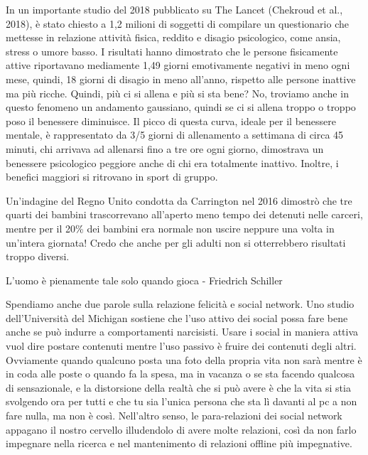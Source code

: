 \documentclass[12pt]{book} %
\begin{document}
\begin{mdframed}[linewidth=1pt]
In un importante studio del 2018 pubblicato su The Lancet (Chekroud et al.,
2018), è stato chiesto a 1,2 milioni
di soggetti di compilare un questionario che mettesse in relazione attività fisica, reddito e disagio psicologico, come
ansia, stress o umore basso. I risultati hanno dimostrato che le persone fisicamente attive riportavano mediamente 1,49
giorni emotivamente negativi in meno ogni mese, quindi, 18 giorni di disagio in meno all'anno,
rispetto alle persone inattive ma più ricche. Quindi, più ci si allena e più si sta bene? No, troviamo anche in questo
fenomeno un andamento gaussiano, quindi se ci si allena troppo o troppo poso il benessere diminuisce. Il picco di
questa curva, ideale per il benessere mentale, è rappresentato da 3/5 giorni di allenamento a settimana di circa 45
minuti, chi arrivava ad allenarsi fino a tre ore ogni giorno, dimostrava un benessere psicologico peggiore anche di chi
era totalmente inattivo. Inoltre, i benefici maggiori si ritrovano in sport di gruppo.


\bigskip

Un'indagine del Regno Unito condotta da Carrington nel 2016 dimostrò che tre quarti dei bambini
trascorrevano all'aperto meno tempo dei detenuti nelle carceri, mentre per il 20\% dei bambini era
normale non uscire neppure una volta in un'intera giornata! Credo che anche per gli adulti non si
otterrebbero risultati troppo diversi.


\bigskip

L'uomo è pienamente tale solo quando gioca - Friedrich Schiller 


\bigskip

Spendiamo anche due parole sulla relazione felicità e social network. Uno studio dell'Università del Michigan sostiene
che l'uso attivo dei social possa fare bene anche se può indurre a comportamenti narcisisti. Usare
i social in maniera attiva vuol dire postare contenuti mentre l'uso passivo è fruire dei contenuti
degli altri. Ovviamente quando qualcuno posta una foto della propria vita non sarà mentre è in coda alle poste o quando
fa la spesa, ma in vacanza o se sta facendo qualcosa di sensazionale, e la distorsione della realtà che si può avere è
che la vita si stia svolgendo ora per tutti e che tu sia l'unica persona che sta lì davanti al pc
a non fare nulla, ma non è così. Nell'altro senso, le para-relazioni dei social network appagano il nostro cervello illudendolo di avere molte relazioni, così da non farlo impegnare nella ricerca e nel mantenimento di relazioni offline più impegnative.


\end{mdframed}
\end{document}
